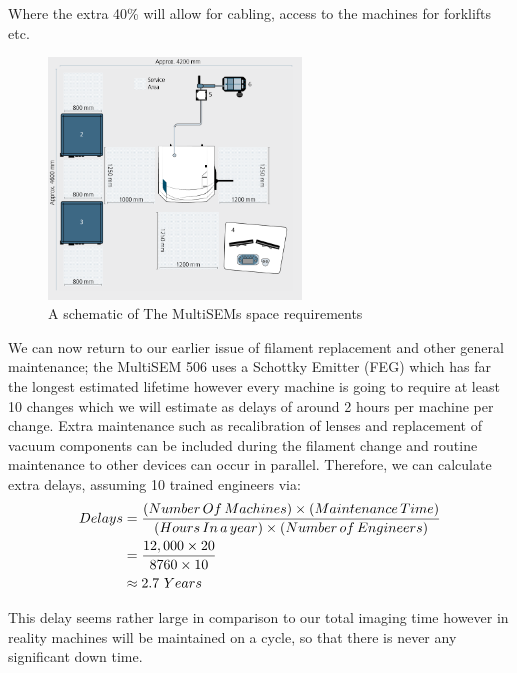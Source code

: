 \documentclass[a4paper, 11pt]{article}
\numberwithin{equation}{section}
\begin{document}
Where the extra 40\% will allow for cabling, access to the machines for forklifts etc.\\
\newline
\begin{figure}[htb!]
	\centering
		\includegraphics[width=0.6\textwidth]{SemFootprint.PNG}
		\caption[A schematic of The MultiSEMs space requirements]{\centering\label{SEMArea} A schematic of The MultiSEMs space requirements\cite{ZeissMulti}}

	
\end{figure}





We can now return to our earlier issue of filament replacement and other general maintenance; the MultiSEM 506 uses a Schottky Emitter (FEG) which has far the longest estimated lifetime however every machine is going to require at least 10 changes which we will estimate as delays of around 2 hours per machine per change. Extra maintenance such as recalibration of lenses and replacement of vacuum components can be included during the filament change and routine maintenance to other devices can occur in parallel. Therefore, we can calculate extra delays, assuming 10 trained engineers via:
\begin{align}
	Delays&= \frac{(Number\thinspace Of\thinspace Machines)\times (Maintenance \thinspace Time)}{ (Hours\thinspace In\thinspace a\thinspace year) \times (Number \thinspace of \thinspace Engineers) }\nonumber\\
	&= \frac{12,000\times20}{8760\times10}\nonumber\\
	&\approx 2.7\ Years
\end{align}

This delay seems rather large in comparison to our total imaging time however in reality machines will be maintained on a cycle, so that there is never any significant down time.
\end{document}
